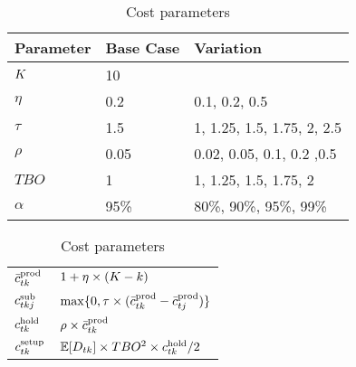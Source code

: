 \documentclass[msom]{oo}
\begin{document}
\begin{table}[ht] 
\small
\begin{minipage}[c]{0.65\linewidth} 
\begin{tabular}{lll}
\toprule
{Parameter} & Base Case & Variation \\ \midrule
$K$   & 10 & \\ 
$\eta$  &   0.2 & 0.1, 0.2, 0.5   \\ 
$\tau$  &   1.5 & 1, 1.25, 1.5, 1.75, 2, 2.5   \\ 
$\rho $  &  0.05 & 0.02, 0.05, 0.1, 0.2 ,0.5  \\ 
$ TBO $  &   1 & 1, 1.25, 1.5, 1.75, 2   \\ 
$ \alpha $  &95\% & 80\%, 90\%, 95\%, 99\%  \\ 
\bottomrule 
\end{tabular} 
\caption{Base case and sensitivity analysis parameters} 
\label{tab:BaseSensitivity}
\end{minipage}%
\begin{minipage}[c]{0.35\linewidth} 
\begin{tabular}{ll}
\toprule
$\bar{c}^{\text{prod}}_{t k}$  & $1+\eta \times(K-k)$ 
\\
$c^{\text{sub}}_{t k j }$  & $\max\{ 0,\tau \times (\bar{c}^{\text{prod}}_{ t k} - \bar{c}^{\text{prod}}_{t j}) \}$ 
\\ 
$c^{\text{hold}}_{t k}$  & $\rho \times \bar{c}^{\text{prod}}_{t k} $ 
\\ 
$c^{\text{setup}}_{t k}$ & $\mathbb{E}[{D_{t k}}]
\times TBO^2 \times c^{\text{hold}}_{t k} /2$ \\ 
\bottomrule
\end{tabular}
\caption{Cost parameters} 
\label{tab:Sub_FD_parameters} 
\end{minipage} 
\end{table} 
\end{document}
